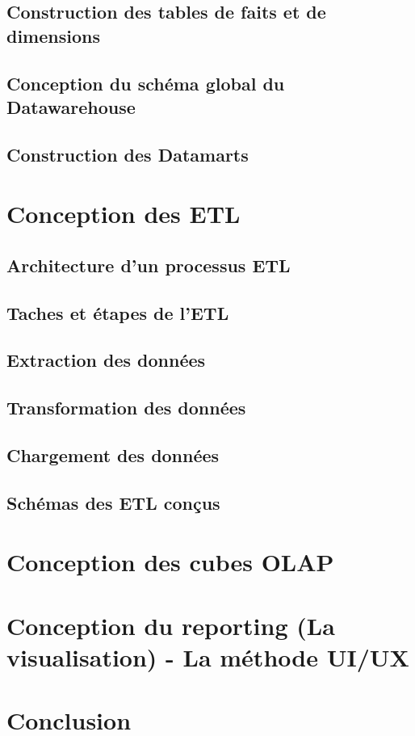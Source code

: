 \subsection{Construction des tables de faits et de dimensions}
\blindtext

\subsection{Conception du schéma global du Datawarehouse}
\blindtext

\subsection{Construction des Datamarts}
\blindtext 

\section{Conception des ETL}
\blindtext

\subsection{Architecture d’un processus ETL}
\blindtext

\subsection{Taches et étapes de l’ETL}
\blindtext

\subsection{Extraction des données}
\blindtext

\subsection{Transformation des données}
\blindtext

\subsection{Chargement des données}
\blindtext

\subsection{Schémas des ETL conçus }
\blindtext

\section{Conception des cubes OLAP}
\blindtext

\section{Conception du reporting (La visualisation) - La méthode UI/UX}
\blindtext

\section*{Conclusion}%
%
\blindtext

